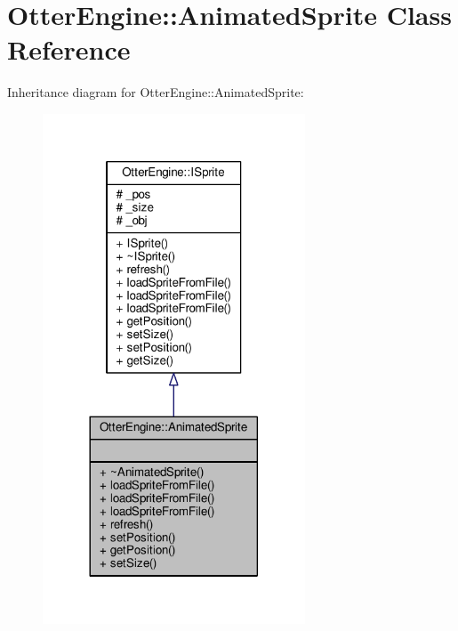\hypertarget{class_otter_engine_1_1_animated_sprite}{}\section{Otter\+Engine\+:\+:Animated\+Sprite Class Reference}
\label{class_otter_engine_1_1_animated_sprite}


Inheritance diagram for Otter\+Engine\+:\+:Animated\+Sprite\+:\nopagebreak
\begin{figure}[H]
\begin{center}
\leavevmode
\includegraphics[width=221pt]{df/dbd/class_otter_engine_1_1_animated_sprite__inherit__graph}
\end{center}
\end{figure}


